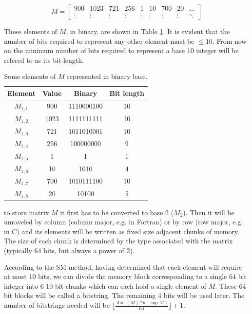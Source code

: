\documentclass[10pt]{article}
\begin{document}
\begin{equation} \label{eq:08}
  M = \begin{bmatrix}
  900 & 1023 & 721 & 256 & 1 & 10 & 700 & 20 & \hdots\\ 
  \vdots & \vdots & \vdots & \vdots & \vdots & \vdots & \vdots & \vdots & \ddots 
  \end{bmatrix}
\end{equation}

These elements of $M$, in binary, are shown in Table \ref{tab:01}. It is evident that the number of bits required to represent any other element must be $\leq 10$. From now on the minimum number of bits required to represent a base 10 integer will be refered to as its bit-length.

\begin{table}[h]
 \centering
 \caption{Some elements of $M$ represented in binary base.}
 \begin{tabular}{cccc} 
  \hline 
  Element & Value  & Binary & Bit length\\
  \hline
  $M_{1,1}$ & 900  & 1110000100 & 10\\
  $M_{1,2}$ & 1023 & 1111111111 & 10\\
  $M_{1,3}$ & 721  & 1011010001 & 10\\
  $M_{1,4}$ & 256  & 100000000  & 9\\
  $M_{1,5}$ & 1    & 1          & 1\\
  $M_{1,6}$ & 10   & 1010       & 4\\
  $M_{1,7}$ & 700  & 1010111100 & 10\\
  $M_{1,8}$ & 20   & 10100      & 5\\
  \hline
 \end{tabular}
 \label{tab:01}
\end{table}

to store matrix $M$ it first has to be converted to base $2$ ($M_2$). Then it will be unraveled by column (column major, e.g. in Fortran) or by row (row major, e.g. in C) and its elements will be written as  fixed size adjacent chunks of memory. The size of each chunk is determined by the type associated with the matrix (typically 64 bits, but always a power of 2).

According to the SM method, having determined that each element will require at most 10 bits, we can divide the memory block corresponding to a single 64 bit integer into 6 10-bit chunks which can each hold a single element of $M$. These 64-bit blocks will be called a bitstring. The remaining 4 bits will be used later. The number of bitstrings needed will be $\lfloor \frac{\dim(M) *b(\sup M)} {64} \rfloor +1$.
\end{document}

